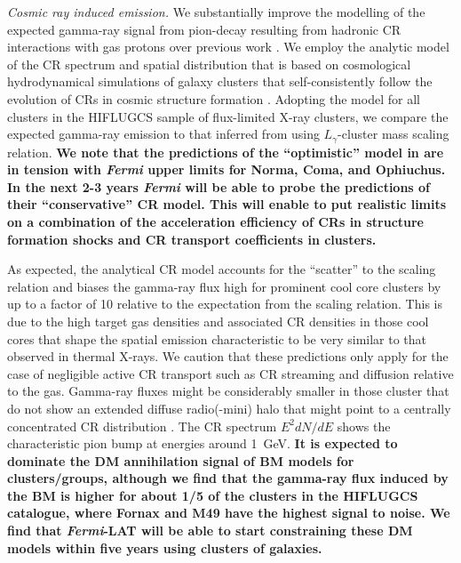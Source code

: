 \documentclass[10pt,aps,pra,reprint,amsmath,amsfonts,amssymb,showpacs,nofootinbib,floatfix]{revtex4-1}
\def\del#1{{}}
\def\C#1{{\bf #1}}
\newcommand{\Fermi}{{\em Fermi}\xspace}
\begin{document}
{\em Cosmic ray induced emission.} We substantially improve the
modelling of the expected gamma-ray signal from pion-decay resulting
from hadronic CR interactions with gas protons over previous work
\cite{2010ApJ...717L..71A}. We employ the analytic model of the CR
spectrum and spatial distribution that is based on cosmological
hydrodynamical simulations of galaxy clusters that self-consistently
follow the evolution of CRs in cosmic structure formation
\cite{2010MNRAS.409..449P}. Adopting the model for all clusters in the
HIFLUGCS sample of flux-limited X-ray clusters, we compare the
expected gamma-ray emission to that inferred from using
$L_\gamma$-cluster mass scaling relation. \C{We note that the
  predictions of the ``optimistic'' model in
  \cite{2010MNRAS.409..449P} are in tension with \Fermi upper limits
  for Norma, Coma, and Ophiuchus. In the next 2-3 years \Fermi will be
  able to probe the predictions of their ``conservative'' CR
  model. This will enable to put realistic limits on a combination of
  the acceleration efficiency of CRs in structure formation shocks and
  CR transport coefficients in clusters.} 

As expected, the analytical CR model accounts for the ``scatter'' to
the scaling relation and biases the gamma-ray flux high for prominent
cool core clusters by up to a factor of 10 relative to the expectation
from the scaling relation. This is due to the high target gas
densities and associated CR densities in those cool cores that shape
the spatial emission characteristic to be very similar to that
observed in thermal X-rays. We caution that these predictions only
apply for the case of negligible active CR transport such as CR
streaming and diffusion relative to the gas. Gamma-ray fluxes might be
considerably smaller in those cluster that do not show an extended
diffuse radio(-mini) halo that might point to a centrally concentrated
CR distribution \cite{2011A&A...527A..99E}. The CR spectrum $E^2
dN/dE$ shows the characteristic pion bump at energies around
1~GeV. \C{It is expected to dominate the DM annihilation signal of BM
  models for clusters/groups, although we find that the gamma-ray flux
  induced by the BM is higher for about 1/5 of the clusters in the
  HIFLUGCS catalogue, where Fornax and M49 have the highest signal to
  noise. We find that \Fermi-LAT will be able to start constraining
  these DM models within five years using clusters of galaxies.}
\del{It is expected to dominate the DM annihilation signal of BM
  models for all clusters/groups but Fornax.}
\end{document}
